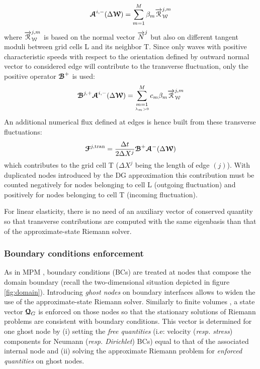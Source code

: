 \begin{equation}
{\boldsymbol{\mathcal{A}}}^{i,-}(\Delta {\boldsymbol{\mathcal{W}}}) = \sum_{m=1}^{M} \beta_m {\overrightarrow{\mathcal{R}}}^{j,m}_{\mathcal{W}}
\end{equation}
where ${\overrightarrow{\mathcal{R}}}_{\mathcal{W}}^{j,m}$ is based on the normal vector ${\overrightarrow{N}}^j$ but also on different tangent moduli between grid cells L and its neighbor T. Since only waves with positive characteristic speeds with respect to the orientation defined by outward normal vector to considered edge will contribute to the transverse fluctuation, only the positive operator ${\boldsymbol{\mathcal{B}}}^+$ is used:
\begin{equation}
{\boldsymbol{\mathcal{B}}}^{j,+} {\boldsymbol{\mathcal{A}}}^{i,-}(\Delta {\boldsymbol{\mathcal{W}}}) = \sum_{\underset{\lambda_m >0}{m=1}}^{M} c_m \beta_m {\overrightarrow{\mathcal{R}}}_{\mathcal{W}}^{j,m} \label{eq:transverse_fluctuations}
\end{equation}
An additional numerical flux defined at edges is hence built from these transverse fluctuations:
\begin{equation}
{\boldsymbol{\mathcal{F}}}^{j,\text{tran}} = \frac{\Delta t}{2 \Delta X^j} {\boldsymbol{\mathcal{B}}}^+ {\boldsymbol{\mathcal{A}}}^-(\Delta {\boldsymbol{\mathcal{W}}}) \label{eq:transverse_corrections}
\end{equation}
which contributes to the grid cell T ($\Delta X^j$ being the length of edge $(j)$). With duplicated nodes introduced by the DG approximation this contribution must be counted negatively for nodes belonging to cell L (outgoing fluctuation) and positively for nodes belonging to cell T (incoming fluctuation).

\begin{remark} 
  For linear elasticity, there is no need of an auxiliary vector of conserved quantity so that transverse contributions are computed with the same eigenbasis than that of the approximate-state Riemann solver.
\end{remark}

\subsubsection*{Boundary conditions enforcement}
As in MPM \cite{Love,BC_MPM}, boundary conditions (BCs) are treated at nodes that compose the domain boundary (recall the two-dimensional situation depicted in figure \ref{fig:domain}). Introducing \textit{ghost nodes} on boundary interfaces allows to widen the use of the approximate-state Riemann solver. Similarly to finite volumes \cite{Leveque}, a state vector ${\boldsymbol{\mathcal{Q}}}_G$ is enforced on those nodes so that the stationary solutions of Riemann problems are consistent with boundary conditions. This vector is determined for one ghost node by (i) setting the \textit{free quantities} (i.e: velocity (\textit{resp. stress}) components for Neumann (\textit{resp. Dirichlet}) BCs) equal to that of the associated internal node and (ii) solving the approximate Riemann problem for \textit{enforced quantities} on ghost nodes.

